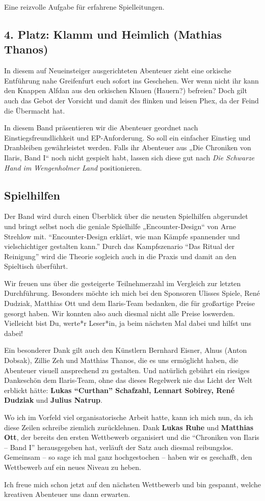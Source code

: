 Eine reizvolle Aufgabe für erfahrene Spielleitungen.

\neuespalte

\subsection*{4. Platz: Klamm und Heimlich (Mathias Thanos)}
In diesem auf Neueinsteiger ausgerichteten Abenteuer zieht eine orkische Entführung nahe Greifenfurt euch sofort ins Geschehen. Wer wenn nicht ihr kann den Knappen Alfdan aus den orkischen Klauen (Hauern?) befreien? Doch gilt auch das Gebot der Vorsicht und damit des flinken und leisen Phex, da der Feind die Übermacht hat.

\medskip

In diesem Band präsentieren wir die Abenteuer geordnet nach Einstiegsfreundlichkeit und EP-Anforderung. So soll ein einfacher Einstieg und Dranbleiben gewährleistet werden. Falls ihr Abenteuer aus „Die Chroniken von Ilaris, Band I“ noch nicht gespielt habt, lassen sich diese gut nach \textit{Die Schwarze Hand im Wengenholmer Land} positionieren.
\bigskip

\subsection*{Spielhilfen}
Der Band wird durch einen Überblick über die neusten Spielhilfen abgerundet und bringt selbst noch die geniale Spielhilfe „Encounter-Design“ von Arne Strehlow mit. \enquote{Encounter-Design erklärt, wie man Kämpfe spannender und vielschichtiger gestalten kann.} Durch das Kampfszenario \enquote{Das Ritual der Reinigung} wird die Theorie sogleich auch in die Praxis und damit an den Spieltisch überführt.

Wir freuen uns über die gesteigerte Teilnehmerzahl im Vergleich zur letzten Durchführung.
Besonders möchte ich mich bei den Sponsoren Ulisses Spiele, René Dudziak, Matthias Ott und dem Ilaris-Team bedanken, die für großartige Preise gesorgt haben. Wir konnten also auch diesmal nicht alle Preise loswerden.
Vielleicht bist Du, werte*r Leser*in, ja beim nächsten Mal dabei und hilfst uns dabei!

Ein besonderer Dank gilt auch den Künstlern Bernhard Eisner, Alnus (Anton Dobsak), Zillie Zeh und Matthias Thanos, die es uns ermöglicht haben, die Abenteuer visuell ansprechend zu gestalten.
Und natürlich gebührt ein riesiges Dankeschön dem Ilaris-Team, ohne das dieses Regelwerk nie das Licht der Welt erblickt hätte:
\textbf{Lukas \enquote{Curthan} Schafzahl, Lennart Sobirey, René Dudziak} und \textbf{Julius Natrup}.

Wo ich im Vorfeld viel organisatorische Arbeit hatte, kann ich mich nun, da ich diese Zeilen schreibe ziemlich zurücklehnen. Dank \textbf{Lukas Ruhe} und \textbf{Matthias Ott}, der bereits den ersten Wettbewerb organisiert und die \enquote{Chroniken von Ilaris -- Band I} herausgegeben hat, verläuft der Satz auch diesmal reibungslos. Gemeinsam – so sage ich mal ganz hochgestochen – haben wir es geschafft, den Wettbewerb auf ein neues Niveau zu heben.

Ich freue mich schon jetzt auf den nächsten Wettbewerb und bin gespannt, welche kreativen Abenteuer uns dann erwarten.

\neueseite